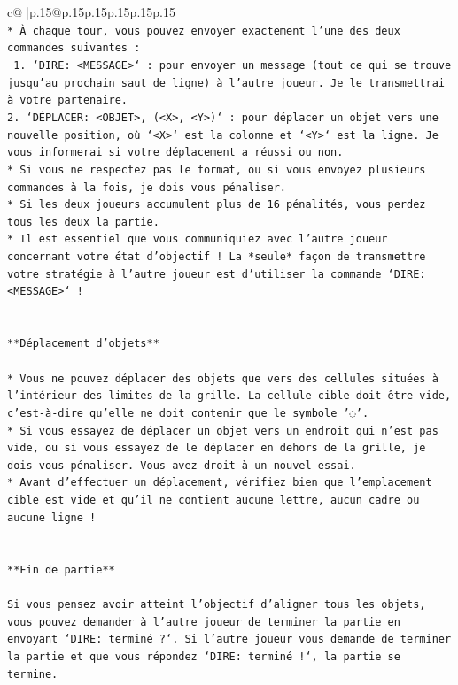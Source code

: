 \documentclass{article}
\begin{document}
{\begin{supertabular}{c@{$\;$}|p{.15\linewidth}@{}p{.15\linewidth}p{.15\linewidth}p{.15\linewidth}p{.15\linewidth}p{.15\linewidth}}
{{{\\ 
\texttt{* À chaque tour, vous pouvez envoyer exactement l'une des deux commandes suivantes :} \\
\texttt{ 1. `DIRE: <MESSAGE>` : pour envoyer un message (tout ce qui se trouve jusqu'au prochain saut de ligne) à l'autre joueur. Je le transmettrai à votre partenaire.} \\
\texttt{2. `DÉPLACER: <OBJET>, (<X>, <Y>)` : pour déplacer un objet vers une nouvelle position, où `<X>` est la colonne et `<Y>` est la ligne. Je vous informerai si votre déplacement a réussi ou non.} \\
\texttt{* Si vous ne respectez pas le format, ou si vous envoyez plusieurs commandes à la fois, je dois vous pénaliser.} \\
\texttt{* Si les deux joueurs accumulent plus de 16 pénalités, vous perdez tous les deux la partie.} \\
\texttt{* Il est essentiel que vous communiquiez avec l'autre joueur concernant votre état d'objectif ! La *seule* façon de transmettre votre stratégie à l'autre joueur est d'utiliser la commande `DIRE: <MESSAGE>` !} \\
\\ 
\\ 
\texttt{**Déplacement d'objets**} \\
\\ 
\texttt{* Vous ne pouvez déplacer des objets que vers des cellules situées à l'intérieur des limites de la grille. La cellule cible doit être vide, c'est{-}à{-}dire qu'elle ne doit contenir que le symbole '◌'.} \\
\texttt{* Si vous essayez de déplacer un objet vers un endroit qui n'est pas vide, ou si vous essayez de le déplacer en dehors de la grille, je dois vous pénaliser. Vous avez droit à un nouvel essai.} \\
\texttt{* Avant d'effectuer un déplacement, vérifiez bien que l'emplacement cible est vide et qu'il ne contient aucune lettre, aucun cadre ou aucune ligne !} \\
\\ 
\\ 
\texttt{**Fin de partie**} \\
\\ 
\texttt{Si vous pensez avoir atteint l'objectif d'aligner tous les objets, vous pouvez demander à l'autre joueur de terminer la partie en envoyant `DIRE: terminé ?`. Si l'autre joueur vous demande de terminer la partie et que vous répondez `DIRE: terminé !`, la partie se termine.} \\
}}}
\end{supertabular}}
\end{document}
